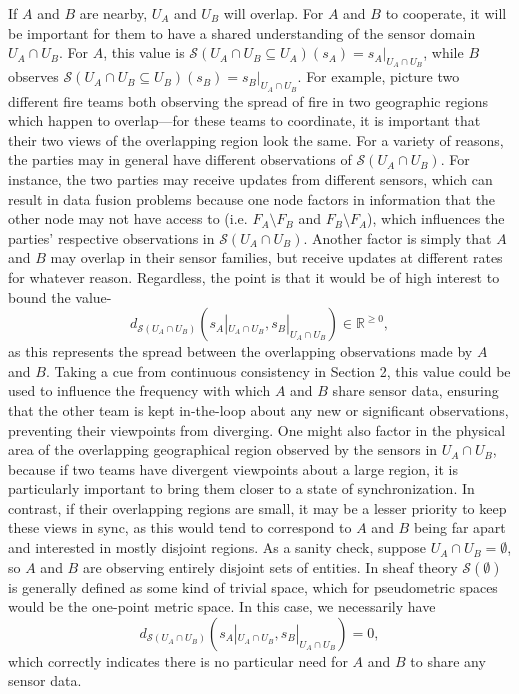 If $A$ and $B$ are nearby, $U_A$ and $U_B$ will overlap. For $A$ and $B$ to cooperate, it will be important for them to have a shared understanding of the sensor domain $U_A \cap U_B$. For $A$, this value is $\mathcal{S}(U_A \cap U_B \subseteq U_A)(s_A) = s_A|_{U_A \cap U_B}$, while $B$ observes  $\mathcal{S}(U_A \cap U_B \subseteq U_B)(s_B) = s_B|_{U_A \cap U_B}$. For example, picture two different fire teams both observing the spread of fire in two geographic regions which happen to overlap---for these teams to coordinate, it is important that their two views of the overlapping region look the same. For a variety of reasons, the parties may in general have different observations of $\mathcal{S}(U_A \cap U_B)$. For instance, the two parties may receive updates from different sensors, which can result in  data fusion problems because one node factors in information that the other node may not have access to (i.e. $F_A \setminus F_B$ and $F_B \setminus F_A$), which influences the parties' respective observations in $\mathcal{S}(U_A \cap U_B)$. Another factor is simply that $A$ and $B$ may overlap in their sensor families, but receive updates at different rates for whatever reason. Regardless, the point is that it would be of high interest to bound the value-
\[ d_{\mathcal{S}(U_A \cap U_B)} \left( s_A|_{U_A \cap U_B}, s_B|_{U_A \cap U_B} \right) \in \mathbb{R}^{\geq 0},
\]
as this represents the spread between the overlapping observations made by $A$ and $B$. Taking a cue from continuous consistency in Section 2, this value could be used to influence the frequency with which $A$ and $B$ share sensor data, ensuring that the other team is kept in-the-loop about any new or significant observations, preventing their viewpoints from diverging. One might also factor in the physical area of the overlapping geographical region observed by the sensors in $U_A \cap U_B$, because if two teams have divergent viewpoints about a large region, it is particularly important to bring them closer to a state of synchronization. In contrast, if their overlapping regions are small, it may be a lesser priority to keep these views in sync, as this would tend to correspond to $A$ and $B$ being far apart and interested in mostly disjoint regions. As a sanity check, suppose $U_A \cap U_B = \emptyset$, so $A$ and $B$ are observing entirely disjoint sets of entities. In sheaf theory $\mathcal{S}(\emptyset)$ is generally defined as some kind of trivial space, which for pseudometric spaces would be the one-point metric space. In this case, we necessarily have
\[ d_{\mathcal{S}(U_A \cap U_B)} \left( s_A|_{U_A \cap U_B}, s_B|_{U_A \cap U_B} \right)  = 0,
\]
which correctly indicates there is no particular need for $A$ and $B$ to share any sensor data.


